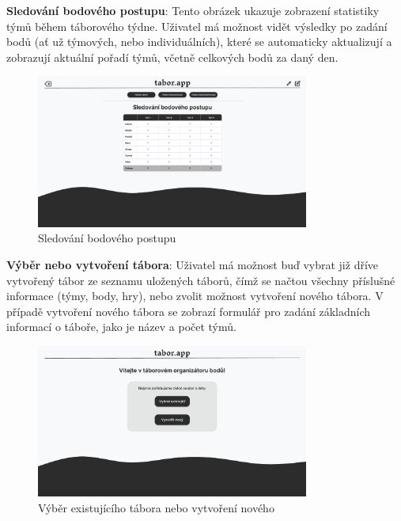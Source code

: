 \documentclass[a4paper, 12pt]{article} %
\begin{document}
\textbf{Sledování bodového postupu}: Tento obrázek ukazuje zobrazení statistiky týmů během 
táborového týdne. Uživatel má možnost vidět výsledky po zadání bodů (ať už týmových, 
nebo individuálních), které se automaticky aktualizují a zobrazují aktuální pořadí týmů, 
včetně celkových bodů za daný den.
\begin{figure}[h!]
    \centering
    \includegraphics[width=0.8\textwidth]{./pictures/picture1.png}
    \caption{Sledování bodového postupu}
\end{figure}

\textbf{Výběr nebo vytvoření tábora}: Uživatel má možnost buď vybrat již dříve vytvořený 
tábor ze seznamu uložených táborů, čímž se načtou všechny příslušné informace 
(týmy, body, hry), nebo zvolit možnost vytvoření nového tábora. V případě vytvoření nového 
tábora se zobrazí formulář pro zadání základních informací o táboře, jako je název a počet 
týmů.
\begin{figure}[h!]
    \centering
    \includegraphics[width=0.8\textwidth]{./pictures/picture8.png}
    \caption{Výběr existujícího tábora nebo vytvoření nového}
\end{figure}

\newpage
\end{document}
